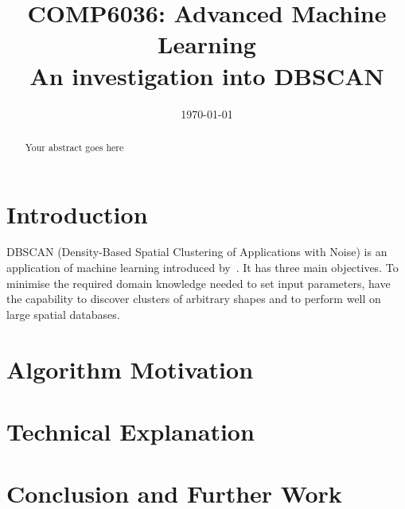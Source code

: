 \documentclass{ecsarticle}     %
\begin{document}
\frontmatter
\title      {COMP6036: Advanced Machine Learning\\[1cm]
            An investigation into DBSCAN}
      
\addresses  {\deptname\\\univname}

\date       {\today}
\subject    {}
\keywords   {}
\maketitle



\begin{abstract}
Your abstract goes here
\end{abstract}

\mainmatter


\section{Introduction}

DBSCAN (Density-Based Spatial Clustering of Applications with Noise) is an application of machine learning introduced by~\cite{Ester96adensity-based}.
It has three main objectives.
To minimise the required domain knowledge needed to set input parameters, have the capability to discover clusters of arbitrary shapes and to perform well on large spatial databases.

\section{Algorithm Motivation}


\section{Technical Explanation}


\section{Conclusion and Further Work}



\end{document}
